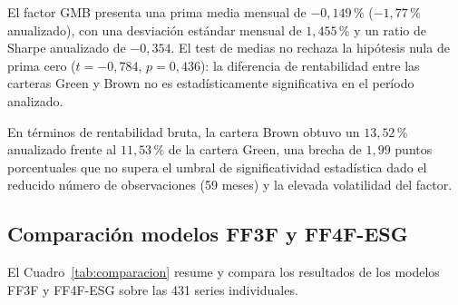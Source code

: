 \documentclass[12pt, a4paper]{article}
\begin{document}
El factor GMB presenta una prima media mensual de $-0{,}149\,\%$ ($-1{,}77\,\%$
anualizado), con una desviaci\'on est\'andar mensual de $1{,}455\,\%$ y un ratio de
Sharpe anualizado de $-0{,}354$. El test de medias no rechaza la hip\'otesis nula de
prima cero ($t = -0{,}784$, $p = 0{,}436$): la diferencia de rentabilidad entre las
carteras Green y Brown no es estad\'isticamente significativa en el per\'iodo analizado.

En t\'erminos de rentabilidad bruta, la cartera Brown obtuvo un $13{,}52\,\%$ anualizado
frente al $11{,}53\,\%$ de la cartera Green, una brecha de $1{,}99$ puntos porcentuales
que no supera el umbral de significatividad estad\'istica dado el reducido n\'umero de
observaciones (59 meses) y la elevada volatilidad del factor.

\subsection{Comparaci\'on modelos FF3F y FF4F-ESG}
\label{subsec:comparacion}

El Cuadro~\ref{tab:comparacion} resume y compara los resultados de los modelos FF3F
y FF4F-ESG sobre las 431 series individuales.
\end{document}

